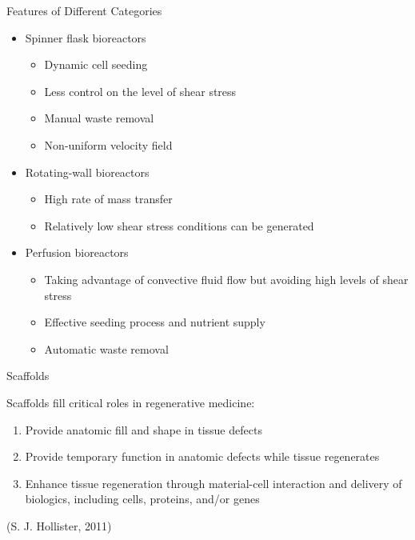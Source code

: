 \documentclass[11pt,t]{beamer}
\begin{document}
\begin{frame}[fragile]{Features of Different Categories}  

\begin{itemize}
\item
Spinner flask bioreactors
\begin{itemize}
\item
Dynamic cell seeding
\item
Less control on the level of shear stress
\item
Manual waste removal
\item
Non-uniform velocity field
\end{itemize}
\item
Rotating-wall bioreactors  
\begin{itemize}
\item
High rate of mass transfer
\item
Relatively low shear stress conditions can be generated
\end{itemize}
\item
Perfusion bioreactors
\begin{itemize}
\item
Taking advantage of convective fluid flow but avoiding high levels of shear stress
\item
Effective seeding process and nutrient supply
\item
Automatic waste removal
\end{itemize}
\end{itemize}	
		
\end{frame}


\begin{frame}[fragile]{Scaffolds}  

Scaffolds fill critical roles in regenerative medicine:

\begin{enumerate}
\item
Provide anatomic fill and shape in
tissue defects
\item
Provide temporary function in anatomic
defects while tissue regenerates
\item
Enhance tissue regeneration through material-cell interaction and delivery of biologics, including cells, proteins, and/or genes
\end{enumerate}

\vfill
\footnotesize(S. J. Hollister, 2011)

		
\end{frame}
\end{document}
